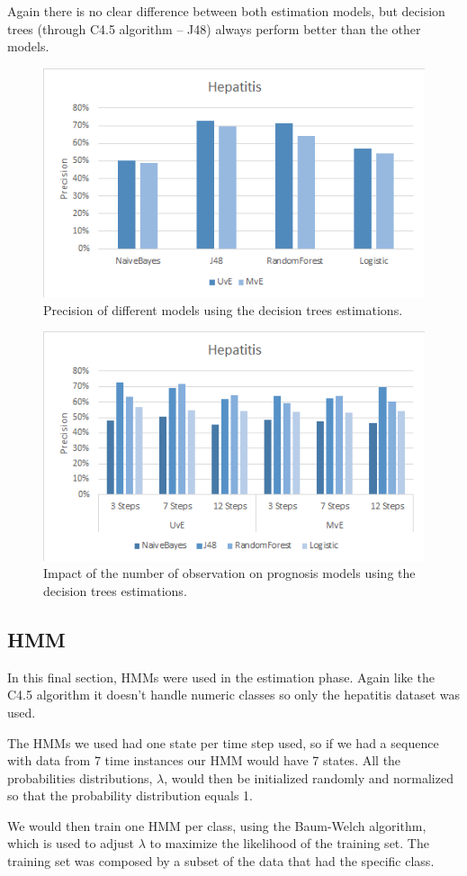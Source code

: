 Again there is no clear difference between both estimation models, but decision trees (through C4.5 algorithm – J48) always 
perform better than the other models. 

\begin{figure}[h]
	\centering
  \includegraphics[width=0.49\linewidth]{Figures/precision_h_tree.png}
  \caption{Precision of different models using the decision trees estimations.}
  \label{fig:precisiontree}
\end{figure}

 \begin{figure}[h]
	\centering
	\includegraphics[width=0.49\linewidth]{Figures/impact_h_tree.png}
  \caption{Impact of the number of observation on prognosis models using the decision trees estimations.}
  \label{fig:impactobservationstree}
\end{figure}

\subsection{HMM}
\label{subsection:hmm}

In this final section, HMMs were used in the estimation phase. Again like the C4.5 algorithm it doesn't handle
numeric classes so only the hepatitis dataset was used.

The HMMs we used had one state per time step used, so if we had a sequence with data from 7 time instances our HMM 
would have 7 states. All the probabilities distributions, $\lambda$, would then be initialized randomly and normalized 
so that the probability distribution equals 1.

We would then train one HMM per class, using the Baum-Welch algorithm, which is used to adjust $\lambda$ to maximize the 
likelihood of the training set. The training set was composed by a subset of the data that had the specific class. 


